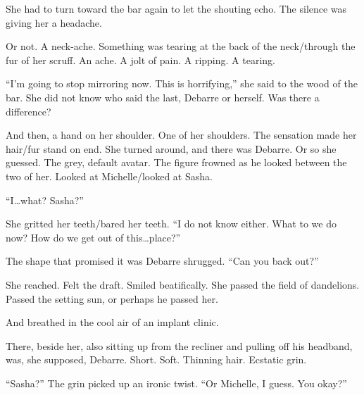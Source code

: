She had to turn toward the bar again to let the shouting echo. The silence was giving her a headache.

Or not. A neck-ache. Something was tearing at the back of the neck/through the fur of her scruff. An ache. A jolt of pain. A ripping. A tearing.

``I'm going to stop mirroring now. This is horrifying,'' she said to the wood of the bar. She did not know who said the last, Debarre or herself. Was there a difference?

And then, a hand on her shoulder. One of her shoulders. The sensation made her hair/fur stand on end. She turned around, and there was Debarre. Or so she guessed. The grey, default avatar. The figure frowned as he looked between the two of her. Looked at Michelle/looked at Sasha.

``I\ldots{}what? Sasha?''

She gritted her teeth/bared her teeth. ``I do not know either. What to we do now? How do we get out of this\ldots{}place?''

The shape that promised it was Debarre shrugged. ``Can you back out?''

She reached. Felt the draft. Smiled beatifically. She passed the field of dandelions. Passed the setting sun, or perhaps he passed her.

And breathed in the cool air of an implant clinic.

There, beside her, also sitting up from the recliner and pulling off his headband, was, she supposed, Debarre. Short. Soft. Thinning hair. Ecstatic grin.

``Sasha?'' The grin picked up an ironic twist. ``Or Michelle, I guess. You okay?''
